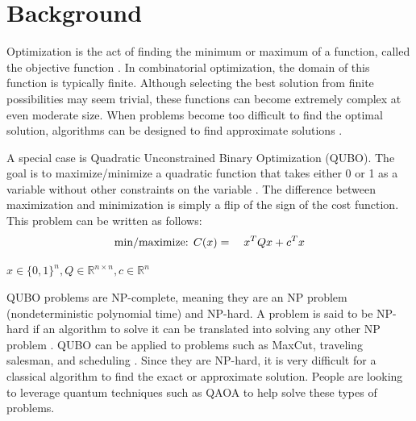 \section{Background}

Optimization is the act of finding the minimum or maximum of a function, called the objective function \cite{groetschel1995}. In combinatorial optimization, the domain of this function is typically finite\cite{groetschel1995}. Although selecting the best solution from finite possibilities may seem trivial, these functions can become extremely complex at even moderate size. When problems become too difficult to find the optimal solution, algorithms can be designed to find approximate solutions \cite{groetschel1995}. 

A special case is Quadratic Unconstrained Binary Optimization (QUBO). The goal is to maximize/minimize a quadratic function that takes either 0 or 1 as a variable without other constraints on the variable \cite{punnen2022}. The difference between maximization and minimization is simply a flip of the sign of the cost function. This problem can be written as follows:
    \begin{equation} 
        \text{min/maximize: } C(x) =\quad x^T Q x + c^T x \\
        \end{equation}
        \centerline{$x \in \{0,1\}^n, Q \in \mathbb{R}^{n \times n}, c \in \mathbb{R}^n$ }
        \vspace{+1mm}

QUBO problems are NP-complete, meaning they are an NP problem (nondeterministic polynomial time) and NP-hard. A problem is said to be NP-hard if an algorithm to solve it can be translated into solving any other NP problem \cite{wolfram}. QUBO can be applied to problems such as MaxCut, traveling salesman, and scheduling \cite{punnen2022}. Since they are NP-hard, it is very difficult for a classical algorithm to find the exact or approximate solution. People are looking to leverage quantum techniques such as QAOA to help solve these types of problems.
    
